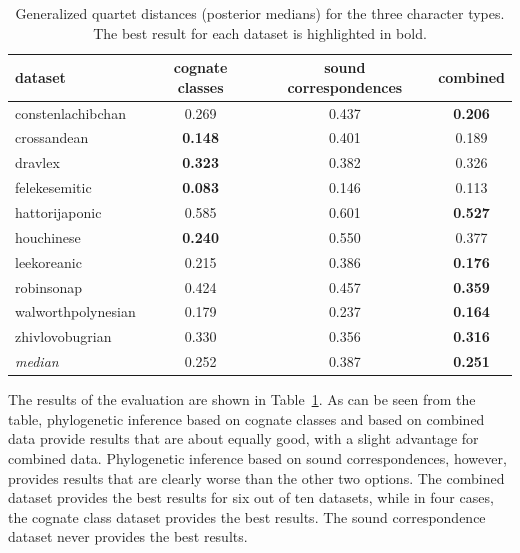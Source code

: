 \documentclass[10pt, a4paper]{article}
\begin{document}
\begin{table}
  \centering
  \begin{tabular}{lccc}
    \toprule
    \textbf{dataset}   & \textbf{cognate classes} & \textbf{sound correspondences} & \textbf{combined} \\\midrule
    constenlachibchan  & 0.269                    & 0.437                          & \textbf{0.206}    \\
    crossandean        & \textbf{0.148}           & 0.401                          & 0.189             \\
    dravlex            & \textbf{0.323}           & 0.382                          & 0.326             \\
    felekesemitic      & \textbf{0.083}           & 0.146                          & 0.113             \\
    hattorijaponic     & 0.585                    & 0.601                          & \textbf{0.527}    \\
    houchinese         & \textbf{0.240}           & 0.550                          & 0.377             \\
    leekoreanic        & 0.215                    & 0.386                          & \textbf{0.176}    \\
    robinsonap         & 0.424                    & 0.457                          & \textbf{0.359}    \\
    walworthpolynesian & 0.179                    & 0.237                          & \textbf{0.164}    \\
    zhivlovobugrian    & 0.330                    & 0.356                          & \textbf{0.316}    \\\midrule
    \emph{median}      & 0.252                    & 0.387                          & \textbf{0.251}    \\\bottomrule
  \end{tabular}\label{tab:4}\caption{Generalized quartet distances (posterior medians) for the three character types. The best result for each dataset is highlighted in bold.}%
\end{table}

The results of the evaluation are shown in Table~\ref{tab:4}. As can be seen from the table, phylogenetic inference based on cognate classes and based on combined data provide results that are about equally good, with a slight advantage for combined data. Phylogenetic inference based on sound correspondences, however, provides results that are clearly worse than the other two options. The combined dataset provides the best results for six out of ten datasets, while in four cases, the cognate class dataset provides the best results. The sound correspondence dataset never provides the best results.
\end{document}
